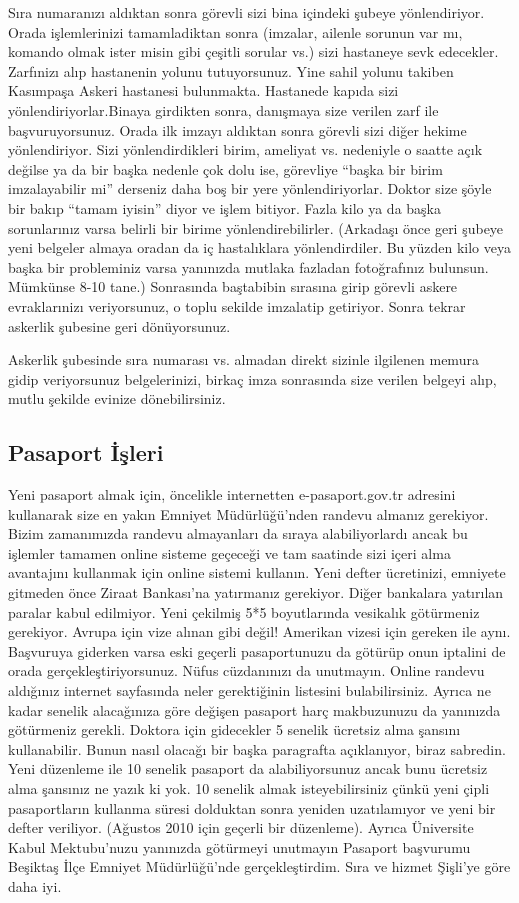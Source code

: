 \documentclass[12pt]{article}
\begin{document}
Sıra numaranızı aldıktan sonra görevli sizi bina içindeki şubeye yönlendiriyor. Orada işlemlerinizi tamamladiktan sonra (imzalar, ailenle sorunun var mı, komando olmak ister misin gibi çeşitli sorular vs.) sizi hastaneye sevk edecekler. Zarfınizı alıp hastanenin yolunu tutuyorsunuz. Yine sahil yolunu takiben Kasımpaşa Askeri hastanesi bulunmakta. Hastanede kapıda sizi yönlendiriyorlar.Binaya girdikten sonra, danışmaya size verilen zarf ile başvuruyorsunuz. Orada ilk imzayı aldıktan sonra görevli sizi diğer hekime yönlendiriyor. Sizi yönlendirdikleri birim, ameliyat vs. nedeniyle o saatte açık değilse ya da bir başka nedenle çok dolu ise, görevliye ``başka bir birim imzalayabilir mi'' derseniz daha boş bir yere yönlendiriyorlar. Doktor size şöyle bir bakıp ``tamam iyisin'' diyor ve işlem bitiyor. Fazla kilo ya da başka sorunlarınız varsa belirli bir birime yönlendirebilirler. (Arkadaşı önce geri şubeye yeni belgeler almaya oradan da iç hastalıklara yönlendirdiler. Bu yüzden kilo veya başka bir probleminiz varsa yanınızda mutlaka fazladan fotoğrafınız bulunsun. Mümkünse 8-10 tane.) Sonrasında baştabibin sırasına girip görevli askere evraklarınizı veriyorsunuz, o toplu sekilde imzalatip getiriyor. Sonra tekrar askerlik şubesine geri dönüyorsunuz. 

Askerlik şubesinde sıra numarası vs. almadan direkt sizinle ilgilenen memura gidip veriyorsunuz belgelerinizi, birkaç imza sonrasında size verilen belgeyi alıp, mutlu şekilde evinize dönebilirsiniz. 

\subsection{Pasaport İşleri}
Yeni pasaport almak için, öncelikle internetten e-pasaport.gov.tr adresini kullanarak size en yakın Emniyet Müdürlüğü'nden randevu almanız gerekiyor. Bizim zamanımızda randevu almayanları da sıraya alabiliyorlardı ancak bu işlemler tamamen online sisteme geçeceği ve tam saatinde sizi içeri alma avantajını kullanmak için online sistemi kullanın. Yeni defter ücretinizi, emniyete gitmeden önce Ziraat Bankası'na yatırmanız gerekiyor. Diğer bankalara yatırılan paralar kabul edilmiyor. Yeni çekilmiş 5*5 boyutlarında vesikalık götürmeniz gerekiyor. Avrupa için vize alınan gibi değil! Amerikan vizesi için gereken ile aynı. Başvuruya giderken varsa eski geçerli pasaportunuzu da götürüp onun iptalini de orada gerçekleştiriyorsunuz. Nüfus cüzdanınızı da unutmayın. Online randevu aldığınız internet sayfasında neler gerektiğinin listesini bulabilirsiniz. Ayrıca ne kadar senelik alacağınıza göre değişen pasaport harç makbuzunuzu da yanınızda götürmeniz gerekli. Doktora için gidecekler 5 senelik ücretsiz alma şansını kullanabilir. Bunun nasıl olacağı bir başka paragrafta açıklanıyor, biraz sabredin. Yeni düzenleme ile 10 senelik pasaport da alabiliyorsunuz ancak bunu ücretsiz alma şansınız ne yazık ki yok. 10 senelik almak isteyebilirsiniz çünkü yeni çipli pasaportların kullanma süresi dolduktan sonra yeniden uzatılamıyor ve yeni bir defter veriliyor. (Ağustos 2010 için geçerli bir düzenleme). Ayrıca Üniversite Kabul Mektubu’nuzu yanınızda götürmeyi unutmayın Pasaport başvurumu Beşiktaş İlçe Emniyet Müdürlüğü’nde gerçekleştirdim. Sıra ve hizmet Şişli’ye göre daha iyi. 
\end{document}
